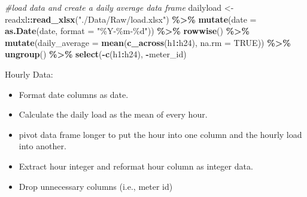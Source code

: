\documentclass[
]{article}
\newenvironment{Shaded}{\begin{snugshade}}{\end{snugshade}}
\newcommand{\AttributeTok}[1]{\textcolor[rgb]{0.13,0.29,0.53}{#1}}
\newcommand{\CommentTok}[1]{\textcolor[rgb]{0.56,0.35,0.01}{\textit{#1}}}
\newcommand{\ConstantTok}[1]{\textcolor[rgb]{0.56,0.35,0.01}{#1}}
\newcommand{\FunctionTok}[1]{\textcolor[rgb]{0.13,0.29,0.53}{\textbf{#1}}}
\newcommand{\NormalTok}[1]{#1}
\newcommand{\OtherTok}[1]{\textcolor[rgb]{0.56,0.35,0.01}{#1}}
\newcommand{\SpecialCharTok}[1]{\textcolor[rgb]{0.81,0.36,0.00}{\textbf{#1}}}
\newcommand{\StringTok}[1]{\textcolor[rgb]{0.31,0.60,0.02}{#1}}
\providecommand{\tightlist}{%
  \setlength{\itemsep}{0pt}\setlength{\parskip}{0pt}}
\begin{document}
\begin{Shaded}
\begin{Highlighting}[]
\CommentTok{\#load data and create a daily average data frame}
\NormalTok{dailyload }\OtherTok{\textless{}{-}}\NormalTok{ readxl}\SpecialCharTok{::}\FunctionTok{read\_xlsx}\NormalTok{(}\StringTok{"./Data/Raw/load.xlsx"}\NormalTok{) }\SpecialCharTok{\%\textgreater{}\%}
    \FunctionTok{mutate}\NormalTok{(}\AttributeTok{date =} \FunctionTok{as.Date}\NormalTok{(date, }\AttributeTok{format =} \StringTok{"\%Y{-}\%m{-}\%d"}\NormalTok{)) }\SpecialCharTok{\%\textgreater{}\%}  
    \FunctionTok{rowwise}\NormalTok{() }\SpecialCharTok{\%\textgreater{}\%}
    \FunctionTok{mutate}\NormalTok{(}\AttributeTok{daily\_average =} \FunctionTok{mean}\NormalTok{(}\FunctionTok{c\_across}\NormalTok{(h1}\SpecialCharTok{:}\NormalTok{h24), }\AttributeTok{na.rm =} \ConstantTok{TRUE}\NormalTok{)) }\SpecialCharTok{\%\textgreater{}\%}  
    \FunctionTok{ungroup}\NormalTok{() }\SpecialCharTok{\%\textgreater{}\%}
    \FunctionTok{select}\NormalTok{(}\SpecialCharTok{{-}}\FunctionTok{c}\NormalTok{(h1}\SpecialCharTok{:}\NormalTok{h24), }\SpecialCharTok{{-}}\NormalTok{meter\_id)}
\end{Highlighting}
\end{Shaded}

Hourly Data:

\begin{itemize}
\tightlist
\item
  Format date columns as date.
\item
  Calculate the daily load as the mean of every hour.
\item
  pivot data frame longer to put the hour into one column and the hourly
  load into another.
\item
  Extract hour integer and reformat hour column as integer data.
\item
  Drop unnecessary columns (i.e., meter id)
\end{itemize}
\end{document}
